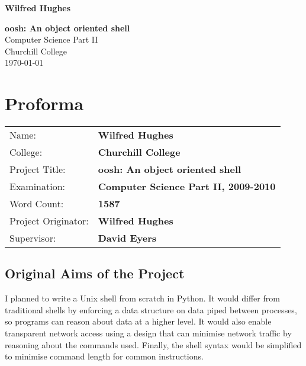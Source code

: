 \documentclass[12pt,twoside,notitlepage]{report}
\begin{document}





\pagestyle{empty}

\hfill{\LARGE \bf Wilfred Hughes}

\vspace*{60mm}
\begin{center}
\Huge
{\bf oosh: An object oriented shell} \\
\vspace*{5mm}
Computer Science Part II \\
\vspace*{5mm}
Churchill College \\
\vspace*{5mm}
\today  %
\end{center}

\cleardoublepage


\setcounter{page}{1}
\pagestyle{plain}

\chapter*{Proforma}

{\large
\begin{tabular}{ll}
Name:               & \bf Wilfred Hughes                       \\
College:            & \bf Churchill College                     \\
Project Title:      & \bf oosh: An object oriented shell \\
Examination:        & \bf Computer Science Part II, 2009-2010        \\
Word Count:         & \bf 1587 \\
Project Originator: & \bf Wilfred Hughes                    \\
Supervisor:         & \bf David Eyers                    \\ 
\end{tabular}
}

\section*{Original Aims of the Project}
I planned to write a Unix shell from scratch in Python. It would differ from
traditional shells by enforcing a data structure on data piped between processes,
so programs can reason about data at a higher level. It would also enable
transparent network access using a design that can minimise network traffic by
reasoning about the commands used. Finally, the shell syntax would be simplified
to minimise command length for common instructions.
\end{document}
